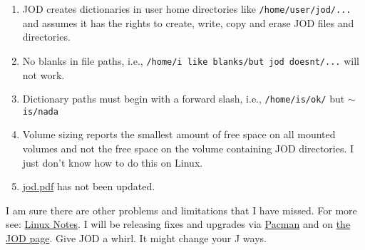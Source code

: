 \begin{enumerate}
\tightlist
\item
  JOD creates dictionaries in user home directories like
  \texttt{/home/user/jod/...} and assumes it has the rights to create,
  write, copy and erase JOD files and directories.
\item
  No blanks in file paths, i.e., \texttt{/home/i like blanks/but jod doesnt/...}
  will not work.
\item
  Dictionary paths must begin with a forward slash, i.e., \texttt{/home/is/ok/}
  but \ensuremath{\sim}\texttt{is/nada}
\item
  Volume sizing reports the smallest amount of free space on all mounted
  volumes and not the free space on the volume containing JOD
  directories. I just don't know how to do this on Linux.
\item
  \href{https://github.com/bakerjd99/jod/blob/master/joddocument/pdfdoc/jod.pdf}{jod.pdf} has not been
  updated.
\end{enumerate}
I am sure there are other problems and limitations that I have missed.
For more see:
\href{https://github.com/bakerjd99/jod/tree/master/jod/joddoc}{Linux
Notes}. I will be releasing fixes and upgrades via
\href{https://code.jsoftware.com/wiki/Pacman}{Pacman} and on
\href{http://bakerjd99.wordpress.com/the-jod-page/}{the JOD page}. Give
JOD a whirl. It might change your J ways.


%


%